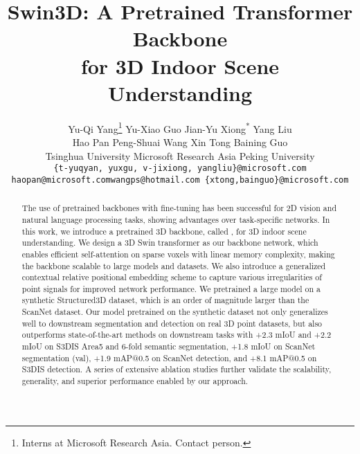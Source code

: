 \documentclass[10pt,twocolumn,letterpaper]{article}
\begin{document}
\title{Swin3D: A Pretrained Transformer Backbone \\for 3D Indoor Scene Understanding}

\author{
{Yu-Qi Yang}\thanks{Interns at Microsoft Research Asia. \textsuperscript{\dag}Contact person.}  \qquad
{Yu-Xiao Guo}\qquad
{Jian-Yu Xiong}\textsuperscript{*} \qquad
{Yang Liu} \\
{Hao Pan}\qquad
{Peng-Shuai Wang}\qquad
{Xin Tong}\qquad
{Baining Guo} \\
\small {{Tsinghua University}\quad \quad
  {Microsoft Research Asia}  \quad\quad
  {Peking University}}  \\
{\tt\small \{t-yuqyan, yuxgu, v-jixiong, yangliu\}@microsoft.com} \\
{\tt\small haopan@microsoft.com\quad wangps@hotmail.com\quad
\{xtong,bainguo\}@microsoft.com}
}

\maketitle
\ificcvfinal\thispagestyle{empty}\fi


\begin{abstract}
  The use of pretrained backbones with fine-tuning has been successful for 2D vision and natural language processing tasks, showing advantages over task-specific networks. In this work, we introduce a pretrained 3D backbone, called {\SST}, for 3D indoor scene understanding. We design a 3D Swin transformer as our backbone network, which enables efficient self-attention on sparse voxels with linear memory complexity, making the backbone scalable to large models and datasets. We also introduce a generalized contextual relative positional embedding scheme to capture various irregularities of point signals for improved network performance. We pretrained a large {\SST} model on a synthetic Structured3D dataset, which is an order of magnitude larger than the ScanNet dataset. Our model pretrained on the synthetic dataset not only generalizes well to downstream segmentation and detection on real 3D point datasets, but also outperforms state-of-the-art methods on downstream tasks with +2.3 mIoU and +2.2 mIoU on S3DIS Area5 and 6-fold semantic segmentation, +1.8 mIoU on ScanNet segmentation (val), +1.9 mAP@0.5 on ScanNet detection, and +8.1 mAP@0.5 on S3DIS detection. A series of extensive ablation studies further validate the scalability, generality, and superior performance enabled by our approach.  \end{abstract}
\end{document}
